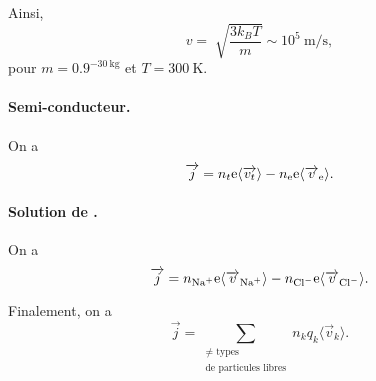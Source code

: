                 Ainsi,
                \begin{equation*}
                    v=\sqrt[]{\frac{3k_B T}{m}}\sim 10^{5}~\si{\metre\per\second},
                \end{equation*}
                pour $m=0.9^{-30~\si{\kilo\gram}}$ et $T=300~\si{\kelvin}$.

            \paragraph{Semi-conducteur.} 

                On a 
                \begin{equation*}
                    \protect\overrightarrow{{j}}=n_t\mathrm{e}\langle \protect\overrightarrow{{v_t}}\rangle-n_{\mathrm{e}}\mathrm{e}\langle\protect\overrightarrow{{v}}_{\mathrm{e}}\rangle.
                \end{equation*}

            \paragraph{Solution de .}

                On a 
                \begin{equation*}
                    \vec{j}=n_{\ce{Na+}}\rme\langle\vec{v}_{\ce{Na+}}\rangle-n_{\ce{Cl-}}\rme\langle\vec{v}_{\ce{Cl-}}\rangle.
                \end{equation*}

            Finalement, on a 
            \begin{equation*}
                \boxed{
                    \vec{j}=\sum_{\substack{\neq\text{ types}\\\text{de particules libres}}}n_k q_k\langle \vec{v}_k\rangle.
                }
            \end{equation*}